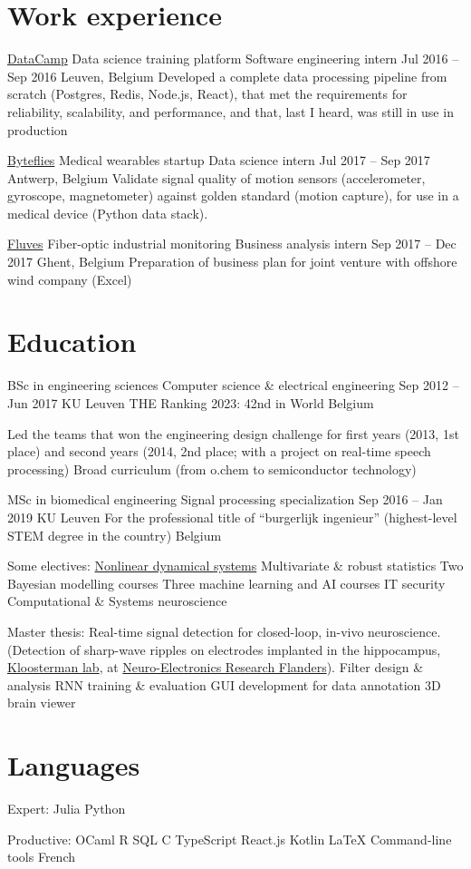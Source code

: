 \documentclass[a4]{article}
\begin{document}
\section{Work experience}

\href{https://www.datacamp.com}{DataCamp}
Data science training platform
Software engineering intern
Jul 2016  –  Sep 2016
Leuven, Belgium
Developed a complete data processing pipeline from scratch (Postgres, Redis, Node.js, React), that met the requirements for reliability, scalability, and performance, and that, last I heard, was still in use in production

\href{https://byteflies.com}{Byteflies}
Medical wearables startup
Data science intern
Jul 2017  –  Sep 2017
Antwerp, Belgium
Validate signal quality of motion sensors (accelerometer, gyroscope, magnetometer) against golden standard (motion capture), for use in a medical device (Python data stack).

\href{https://www.fluves.com}{Fluves}
Fiber-optic industrial monitoring
Business analysis intern
Sep 2017  –  Dec 2017
Ghent, Belgium
Preparation of business plan for joint venture with offshore wind company (Excel)



\section{Education}


BSc in engineering sciences
Computer science \& electrical engineering
Sep 2012  –  Jun 2017
KU Leuven
THE Ranking 2023: 42nd in World
Belgium

Led the teams that won the engineering design challenge for first years (2013, 1st place) and second years (2014, 2nd place; with a project on real-time speech processing)
Broad curriculum (from o.chem to semiconductor technology)


MSc in biomedical engineering
Signal processing specialization
Sep 2016  –  Jan 2019
KU Leuven
For the professional title of “burgerlijk ingenieur”  (highest-level STEM degree in the country)
Belgium

Some electives:
\href{https://github.com/tfiers/strogatz#readme}{Nonlinear dynamical systems}
Multivariate \& robust statistics
Two Bayesian modelling  courses
Three machine learning and AI courses
IT security
Computational \& Systems neuroscience

Master thesis:  Real-time signal detection for closed-loop, in-vivo neuroscience. (Detection of sharp-wave ripples on electrodes implanted in the hippocampus, \href{https://www.nerf.be/research/nerf-labs/fabian-kloosterman}{Kloosterman lab}, at \href{https://www.nerf.be}{Neuro-Electronics Research Flanders}).
Filter design \& analysis
RNN training \& evaluation
GUI development for data annotation
3D brain viewer


\section{Languages}

Expert:
Julia
Python

Productive:
OCaml
R
SQL
C
TypeScript
React.js
Kotlin
LaTeX
Command-line tools
French
\end{document}
